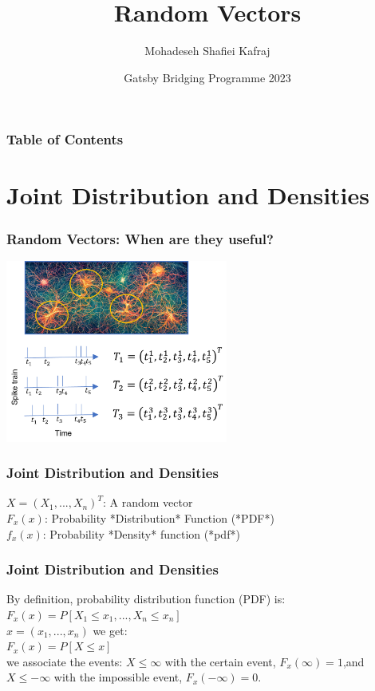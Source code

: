 \documentclass{beamer}
\title[Random Vectors ]
{Random Vectors\newline }
\subtitle{}
\author[Mohadeseh Shafiei Kafraj] %
{Mohadeseh Shafiei Kafraj\inst{1}}
\institute[UCL] %
{
  \inst{1}%
  Gatsby Computational Neuroscience Unit\\
  University College London
}
\date[Gatsby Bridging Programme  2023] %
{Gatsby Bridging Programme 2023}
\begin{document}
\frame{\titlepage}

\begin{frame}
\frametitle{Table of Contents}
\tableofcontents
\end{frame}


\section{Joint Distribution and Densities}
\begin{frame}
\frametitle{Random Vectors: When are they useful?}
\center \includegraphics[height=6cm]{Random_Vector_Example.png}
\end{frame}

\begin{frame}
\frametitle{Joint Distribution and Densities}
$X = (X_1, ..., X_n)^T$: A random vector\newline \\
$F_x(x)$: Probability *Distribution* Function (*PDF*)\newline\\
$f_x(x)$: Probability *Density* function (*pdf*)\newline\\
\end{frame}

\begin{frame}
\frametitle{Joint Distribution and Densities}
By definition, probability distribution function (PDF) is:\newline
$F_x(x) = P[X_1 \le x_1, ..., X_n\le x_n]$\newline\\
$x = (x_1, ..., x_n)$ we get:\newline\\
$F_x(x) = P[X\le x]$\newline\\
we associate the events:\newline
${X \le \infty}$ with the certain event, $F_x(\infty) = 1$,and\newline\\
${X \le -\infty}$ with the impossible event, $F_x(-\infty) = 0.$\\
\end{frame}
\end{document}
